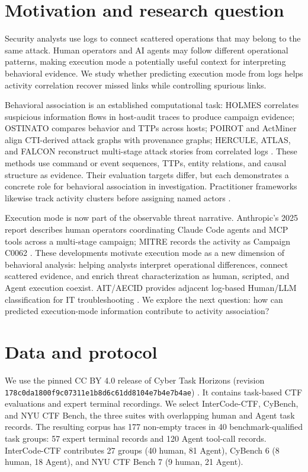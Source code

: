 \section{Motivation and research question}

Security analysts use logs to connect scattered operations that may belong to the same attack. Human operators and AI agents may follow different operational patterns, making execution mode a potentially useful context for interpreting behavioral evidence. We study whether predicting execution mode from logs helps activity correlation recover missed links while controlling spurious links.

Behavioral association is an established computational task: HOLMES correlates suspicious information flows in host-audit traces to produce campaign evidence; OSTINATO compares behavior and TTPs across hosts; POIROT and ActMiner align CTI-derived attack graphs with provenance graphs; HERCULE, ATLAS, and FALCON reconstruct multi-stage attack stories from correlated logs \cite{holmes,ostinato,poirot,actminer,hercule,atlas,falcon}. These methods use command or event sequences, TTPs, entity relations, and causal structure as evidence. Their evaluation targets differ, but each demonstrates a concrete role for behavioral association in investigation. Practitioner frameworks likewise track activity clusters before assigning named actors \cite{unit42}.

Execution mode is now part of the observable threat narrative. Anthropic's 2025 report describes human operators coordinating Claude Code agents and MCP tools across a multi-stage campaign; MITRE records the activity as Campaign C0062 \cite{anthropic,mitrec0062}. These developments motivate execution mode as a new dimension of behavioral analysis: helping analysts interpret operational differences, connect scattered evidence, and enrich threat characterization as human, scripted, and Agent execution coexist. AIT/AECID provides adjacent log-based Human/LLM classification for IT troubleshooting \cite{ait}. We explore the next question: how can predicted execution-mode information contribute to activity association?

\section{Data and protocol}

We use the pinned CC BY 4.0 release of Cyber Task Horizons (revision \texttt{178c0da1800f9\allowbreak c07311e1b8d\allowbreak 6c61dd8104e7b\allowbreak 4e7b4ae}) \cite{cth}. It contains task-based CTF evaluations and expert terminal recordings. We select InterCode-CTF, CyBench, and NYU CTF Bench, the three suites with overlapping human and Agent task records. The resulting corpus has 177 non-empty traces in 40 benchmark-qualified task groups: 57 expert terminal records and 120 Agent tool-call records. InterCode-CTF contributes 27 groups (40 human, 81 Agent), CyBench 6 (8 human, 18 Agent), and NYU CTF Bench 7 (9 human, 21 Agent).

